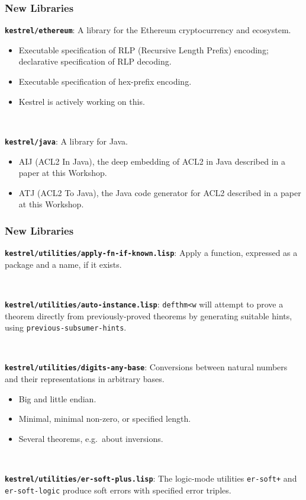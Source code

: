 \documentclass{beamer}
\newcommand{\code}[1]{\texttt{#1}}
\newcommand{\bookpath}[1]{\textbf{\code{#1}}}
\newcommand{\newlibtitle}{\frametitle{New Libraries}}
\begin{document}

\begin{frame}

\newlibtitle

\bookpath{kestrel/ethereum}:
A library for the Ethereum
cryptocurrency and ecosystem.
\begin{itemize}
\item
Executable specification of RLP (Recursive Length Prefix) encoding;
declarative specification of RLP decoding.
\item
Executable specification of hex-prefix encoding.
\item
Kestrel is actively working on this.
\end{itemize}

\

\bookpath{kestrel/java}:
A library for Java.
\begin{itemize}
\item
AIJ (ACL2 In Java), the deep embedding of ACL2 in Java
described in a paper at this Workshop.
\item
ATJ (ACL2 To Java), the Java code generator for ACL2
described in a paper at this Workshop.
\end{itemize}

\end{frame}


\begin{frame}

\newlibtitle

\bookpath{kestrel/utilities/apply-fn-if-known.lisp}:
Apply a function, expressed as a package and a name, if it exists.

\

\bookpath{kestrel/utilities/auto-instance.lisp}:
\code{defthm<w} will attempt to prove a theorem directly
from previously-proved theorems by generating
suitable hints, using \code{previous-subsumer-hints}.

\

\bookpath{kestrel/utilities/digits-any-base}:
Conversions between natural numbers
and their representations in arbitrary bases.
\begin{itemize}
\item
Big and little endian.
\item
Minimal, minimal non-zero, or specified length.
\item
Several theorems, e.g.\ about inversions.
\end{itemize}

\

\bookpath{kestrel/utilities/er-soft-plus.lisp}:
The logic-mode utilities \code{er-soft+} and \code{er-soft-logic} produce
soft errors with specified error triples.

\end{frame}
\end{document}
